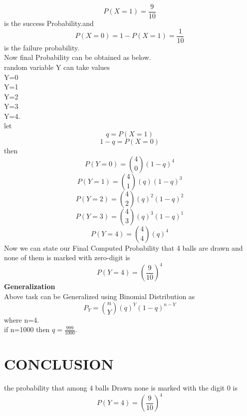 \documentclass[journal,12pt,twocolumn]{IEEEtran}
\begin{document}
\begin{equation*}
    P(X=1) = \frac{9}{10}
\end{equation*}
is the success Probability.and
\begin{equation*}
    P(X=0)=1-P(X=1)=\frac{1}{10}
\end{equation*}
is the failure probability.\\
Now final Probability can be obtained as below.\\ 
random variable Y can take values \\
Y=0\\Y=1\\Y=2\\Y=3\\Y=4.\\
let
\begin{equation*}
    q=P(X=1)
\end{equation*}
\begin{equation*}
    1-q=P(X=0)
\end{equation*}
then
\begin{equation*}
    P(Y=0)=\binom{4}{0}(1-q)^4
\end{equation*}
\begin{equation*}
    P(Y=1)=\binom{4}{1}(q)(1-q)^3 
\end{equation*}
\begin{equation*}
    P(Y=2)=\binom{4}{2}(q)^2(1-q)^2
\end{equation*}
\begin{equation*}
    P(Y=3)=\binom{4}{3}(q)^3(1-q)^1
\end{equation*}
\begin{equation*}
    P(Y=4)=\binom{4}{4}(q)^4
\end{equation*}
Now we can state our Final Computed Probability that 4 balls are drawn and none of them is marked with zero-digit is 
\begin{equation*}
    P(Y=4)=\left(\frac{9}{10}\right)^4
\end{equation*}
\textbf{Generalization}\\
Above task can be Generalized using Binomial Distribution as
\begin{equation*}
    P_Y=\binom{n}{Y}(q)^Y(1-q)^{n-Y}
\end{equation*}
where n=4.\\
if n=1000 then $q=\frac{999}{1000}$.
\section{\textbf{CONCLUSION}}
the probability that among 4 balls Drawn  none is marked with the digit 0 is
\begin{equation*}
    P(Y=4)=\left(\frac{9}{10}\right)^4
\end{equation*}
\end{document}
